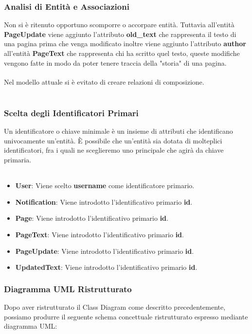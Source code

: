 \documentclass{article}
\begin{document}
{	{\subsubsection{Analisi di Entità e Associazioni}}
	Non si è ritenuto opportuno scomporre o accorpare entità. Tuttavia all'entità \textbf{PageUpdate} viene aggiunto l'attributo \textbf{old\_text} che rappresenta il testo di una pagina prima che venga modificato inoltre viene aggiunto l'attributo \textbf{author} all'entit\`a \textbf{PageText} che rappresenta chi ha scritto quel testo, queste modifiche vengono fatte in modo da poter tenere traccia della "storia" di una pagina.
	\\
	\\	
	Nel modello attuale si è evitato di creare relazioni di composizione.
	\\\\
	{\subsubsection{Scelta degli Identificatori Primari}}
	Un identificatore o chiave minimale \`e un insieme di attributi che identificano univocamente un’entit\`a. \`E possibile che un’entit\`a sia dotata di molteplici identificatori, fra i quali ne sceglieremo uno principale che agir\`a da chiave primaria. \\\\
	
	\begin{itemize}
		\item \textbf{User}: Viene scelto \textbf{username} come identificatore primario.
		\item \textbf{Notification}: Viene introdotto l'identificativo primario \textbf{id}.
		\item \textbf{Page}: Viene introdotto l'identificativo primario \textbf{id}.
		\item \textbf{PageText}: Viene introdotto l'identificativo primario \textbf{id}.
		\item \textbf{PageUpdate}: Viene introdotto l'identificativo primario \textbf{id}.
		\item \textbf{UpdatedText}: Viene introdotto l'identificativo primario \textbf{id}.
	\end{itemize}


	\newpage

	\subsubsection{Diagramma UML Ristrutturato}
	Dopo aver ristrutturato il Class Diagram come descritto precedentemente, possiamo produrre il seguente schema concettuale ristrutturato espresso mediante diagramma UML:
	
}
\end{document}
